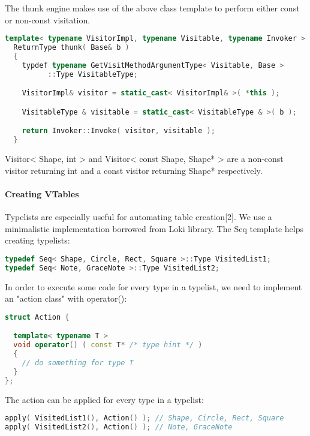 \documentclass{book}
\begin{document}
The thunk engine makes use of the above class template to perform either const or non-const visitation.

\begin{lstlisting}[caption={visitor pattern sample code 5, commandexample.cpp},language=C++]
  template< typename VisitorImpl, typename Visitable, typename Invoker >
  ReturnType thunk( Base& b )
  {
    typdef typename GetVisitMethodArgumentType< Visitable, Base >
          ::Type VisitableType;

    VisitorImpl& visitor = static_cast< VisitorImpl& >( *this ); 

    VisitableType & visitable = static_cast< VisitableType & >( b );

    return Invoker::Invoke( visitor, visitable );
  }
\end{lstlisting}
Visitor< Shape, int > and Visitor< const Shape, Shape* > are a non-const visitor returning int and a const visitor returning Shape* respectively.
\paragraph{Creating VTables}

Typelists are especially useful for automating table creation[2]. We use a minimalistic implementation borrowed from Loki library. The Seq template helps creating typelists:

\begin{lstlisting}[caption={visitor pattern sample code 5, commandexample.cpp},language=C++]
typedef Seq< Shape, Circle, Rect, Square >::Type VisitedList1;
typedef Seq< Note, GraceNote >::Type VisitedList2;
\end{lstlisting}
In order to execute some code for every type in a typelist, we need to implement an "action class" with operator():

\begin{lstlisting}[caption={visitor pattern sample code 5, commandexample.cpp},language=C++]
struct Action {

  template< typename T >
  void operator() ( const T* /* type hint */ )
  {
    // do something for type T
  }
};
\end{lstlisting}

The action can be applied for every type in a typelist:

\begin{lstlisting}[caption={visitor pattern sample code 5, commandexample.cpp},language=C++]
apply( VisitedList1(), Action() ); // Shape, Circle, Rect, Square
apply( VisitedList2(), Action() ); // Note, GraceNote
\end{lstlisting}
\end{document}
